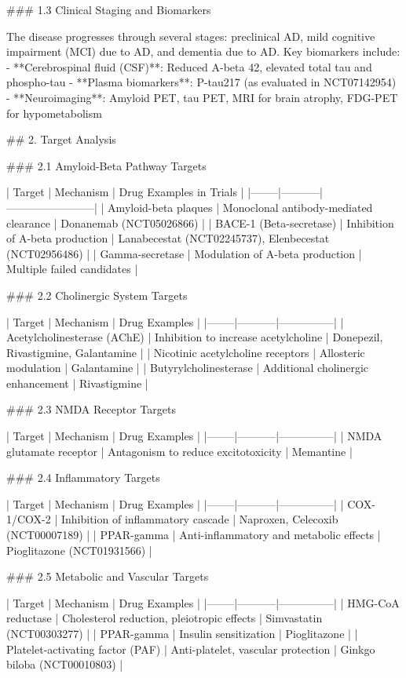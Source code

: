 ### 1.3 Clinical Staging and Biomarkers

The disease progresses through several stages: preclinical AD, mild cognitive impairment (MCI) due to AD, and dementia due to AD. Key biomarkers include:
- **Cerebrospinal fluid (CSF)**: Reduced A-beta 42, elevated total tau and phospho-tau
- **Plasma biomarkers**: P-tau217 (as evaluated in NCT07142954)
- **Neuroimaging**: Amyloid PET, tau PET, MRI for brain atrophy, FDG-PET for hypometabolism

## 2. Target Analysis

### 2.1 Amyloid-Beta Pathway Targets

| Target | Mechanism | Drug Examples in Trials |
|--------|-----------|------------------------|
| Amyloid-beta plaques | Monoclonal antibody-mediated clearance | Donanemab (NCT05026866) |
| BACE-1 (Beta-secretase) | Inhibition of A-beta production | Lanabecestat (NCT02245737), Elenbecestat (NCT02956486) |
| Gamma-secretase | Modulation of A-beta production | Multiple failed candidates |

### 2.2 Cholinergic System Targets

| Target | Mechanism | Drug Examples |
|--------|-----------|---------------|
| Acetylcholinesterase (AChE) | Inhibition to increase acetylcholine | Donepezil, Rivastigmine, Galantamine |
| Nicotinic acetylcholine receptors | Allosteric modulation | Galantamine |
| Butyrylcholinesterase | Additional cholinergic enhancement | Rivastigmine |

### 2.3 NMDA Receptor Targets

| Target | Mechanism | Drug Examples |
|--------|-----------|---------------|
| NMDA glutamate receptor | Antagonism to reduce excitotoxicity | Memantine |

### 2.4 Inflammatory Targets

| Target | Mechanism | Drug Examples |
|--------|-----------|---------------|
| COX-1/COX-2 | Inhibition of inflammatory cascade | Naproxen, Celecoxib (NCT00007189) |
| PPAR-gamma | Anti-inflammatory and metabolic effects | Pioglitazone (NCT01931566) |

### 2.5 Metabolic and Vascular Targets

| Target | Mechanism | Drug Examples |
|--------|-----------|---------------|
| HMG-CoA reductase | Cholesterol reduction, pleiotropic effects | Simvastatin (NCT00303277) |
| PPAR-gamma | Insulin sensitization | Pioglitazone |
| Platelet-activating factor (PAF) | Anti-platelet, vascular protection | Ginkgo biloba (NCT00010803) |

